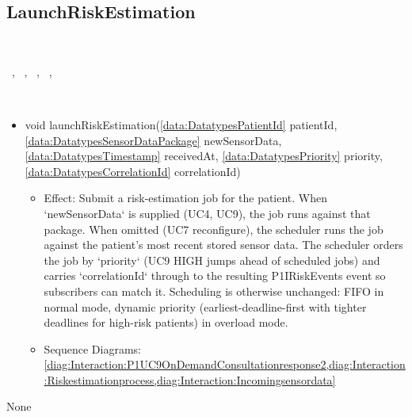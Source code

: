   \subsection{LaunchRiskEstimation}\label{int:InterfacesLaunchRiskEstimation}
    \begin{description}
      \item[Provided by:] \iconcomponent{}~
      \item[Required by:] \iconcomponent{}~, \iconcomponent{}~, \iconcomponent{}~, \iconcomponent{}~, \iconcomponent{}~ 
      \item[Operations:] ~
    \begin{itemize}[noitemsep,nolistsep,leftmargin=-.25cm]
      \item \textsf{void launchRiskEstimation(\ref{data:DatatypesPatientId} patientId, \ref{data:DatatypesSensorDataPackage} newSensorData, \ref{data:DatatypesTimestamp} receivedAt, \ref{data:DatatypesPriority} priority, \ref{data:DatatypesCorrelationId} correlationId)}
        \begin{itemize}[noitemsep,nolistsep]
           \item Effect: Submit a risk-estimation job for the patient. When `newSensorData` is supplied (UC4, UC9), the job runs against that package. When omitted (UC7 reconfigure), the scheduler runs the job against the patient's most recent stored sensor data. The scheduler orders the job by `priority` (UC9 HIGH jumps ahead of scheduled jobs) and carries `correlationId` through to the resulting P1IRiskEvents event so subscribers can match it. Scheduling is otherwise unchanged: FIFO in normal mode, dynamic priority (earliest-deadline-first with tighter deadlines for high-risk patients) in overload mode. 
           \item Sequence Diagrams: \cref{diag:Interaction:P1UC9OnDemandConsultationresponse2,diag:Interaction:Riskestimationprocess,diag:Interaction:Incomingsensordata}
        \end{itemize}
    \end{itemize}
      \item[Diagrams:] None
    \end{description}

